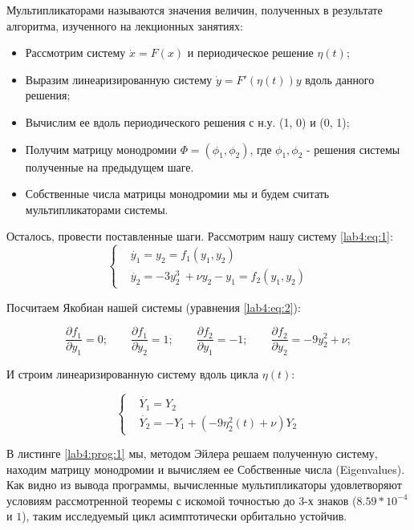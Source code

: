 \clearpage

Мультипликаторами называются значения величин, полученных в результате
алгоритма, изученного на лекционных занятиях:

\begin{itemize}
    \item Рассмотрим систему $\dot{x} = F(x)$ и периодическое решение $\eta(t)$;
    \item Выразим линеаризированную систему $\dot{y} = F'(\eta(t))y$ вдоль
    данного решения;
    \item Вычислим ее вдоль периодического решения с н.у. (1, 0) и (0, 1);
    \item Получим матрицу монодромии $\Phi = (\phi_1, \phi_2)$, где $\phi_1, \phi_2$ -
    решения системы полученные на предыдущем шаге.
    \item Собственные числа матрицы монодромии мы и будем считать мультипликаторами
    системы.
\end{itemize}

Осталось, провести поставленные шаги. Рассмотрим нашу систему \ref{lab4:eq:1}:
\begin{equation}\label{lab4:eq:1}
    \begin{cases}
        &\dot{y_1} = y_2 = f_1(y_1, y_2) \\
        &\dot{y_2} = -3y_2^3\ + \nu y_2 - y_1 = f_2(y_1, y_2)
    \end{cases}
\end{equation}

Посчитаем Якобиан нашей системы (уравнения \ref{lab4:eq:2}):

\begin{equation}\label{lab4:eq:2}
    \frac{\partial f_1}{\partial y_1} = 0;\qquad
    \frac{\partial f_1}{\partial y_2} = 1;\qquad
    \frac{\partial f_2}{\partial y_1} = -1;\qquad
    \frac{\partial f_2}{\partial y_2} = -9y_2^2 + \nu;
\end{equation}

И строим линеаризированную систему вдоль цикла $\eta(t)$:

\begin{equation}\label{lab4:eq:3}
    \begin{cases}
        &\dot{Y_1} = Y_2 \\
        &\dot{Y_2} = -Y_1 + (-9\eta_2^2(t) + \nu)Y_2
    \end{cases}
\end{equation}

В листинге \ref{lab4:prog:1} мы, методом Эйлера решаем полученную систему,
находим матрицу монодромии и вычисляем ее Собственные числа (Eigenvalues).
Как видно из вывода программы, вычисленные мультипликаторы удовлетворяют
условиям рассмотренной теоремы с искомой точностью до 3-х знаков
($8.59 * 10^{-4}$ и $1$), таким исследуемый цикл асимптотически орбитально устойчив.

